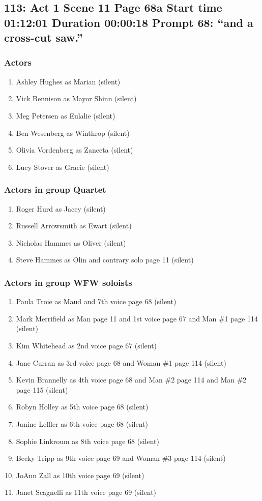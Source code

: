 \subsection{113: Act 1 Scene 11 Page 68a Start time 01:12:01 Duration 00:00:18 Prompt 68: ``and a cross-cut saw.''}

\subsubsection{Actors}
\begin{enumerate}
\item Ashley Hughes as Marian (silent)
\item Vick Bennison as Mayor Shinn (silent)
\item Meg Petersen as Eulalie (silent)
\item Ben Wesenberg as Winthrop (silent)
\item Olivia Vordenberg as Zaneeta (silent)
\item Lucy Stover as Gracie (silent)
\end{enumerate}
\subsubsection{Actors in group Quartet}
\begin{enumerate}
\item Roger Hurd as Jacey (silent)
\item Russell Arrowsmith as Ewart (silent)
\item Nicholas Hammes as Oliver (silent)
\item Steve Hammes as Olin and contrary solo page 11 (silent)
\end{enumerate}
\subsubsection{Actors in group WFW soloists}
\begin{enumerate}
\item Paula Troie as Maud and 7th voice page 68 (silent)
\item Mark Merrifield as Man page 11 and 1st voice page 67 and Man \#1 page 114 (silent)
\item Kim Whitehead as 2nd voice page 67 (silent)
\item Jane Curran as 3rd voice page 68 and Woman \#1 page 114 (silent)
\item Kevin Brannelly as 4th voice page 68 and Man \#2 page 114 and Man \#2 page 115 (silent)
\item Robyn Holley as 5th voice page 68 (silent)
\item Janine Leffler as 6th voice page 68 (silent)
\item Sophie Linkroum as 8th voice page 68 (silent)
\item Becky Tripp as 9th voice page 69 and Woman \#3 page 114 (silent)
\item JoAnn Zall as 10th voice page 69 (silent)
\item Janet Scagnelli as 11th voice page 69 (silent)
\end{enumerate}

